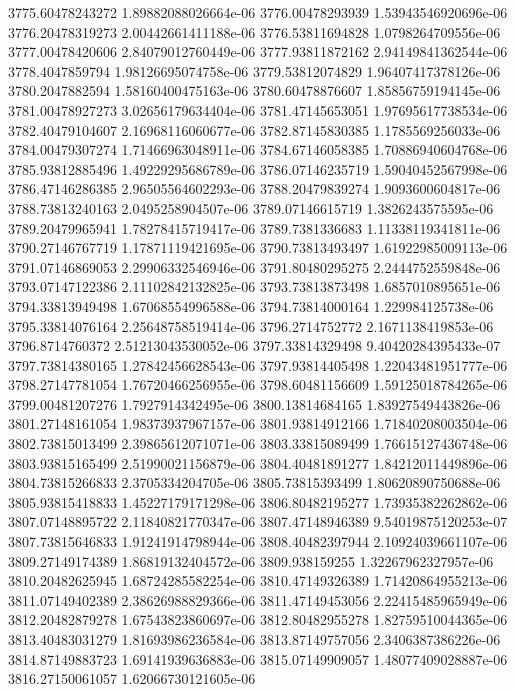 {3775.60478243272 1.89882088026664e-06
3776.00478293939 1.53943546920696e-06
3776.20478319273 2.00442661411188e-06
3776.53811694828 1.0798264709556e-06
3777.00478420606 2.84079012760449e-06
3777.93811872162 2.94149841362544e-06
3778.4047859794 1.98126695074758e-06
3779.53812074829 1.96407417378126e-06
3780.2047882594 1.58160400475163e-06
3780.60478876607 1.85856759194145e-06
3781.00478927273 3.02656179634404e-06
3781.47145653051 1.97695617738534e-06
3782.40479104607 2.16968116060677e-06
3782.87145830385 1.1785569256033e-06
3784.00479307274 1.71466963048911e-06
3784.67146058385 1.70886940604768e-06
3785.93812885496 1.49229295686789e-06
3786.07146235719 1.59040452567998e-06
3786.47146286385 2.96505564602293e-06
3788.20479839274 1.9093600604817e-06
3788.73813240163 2.0495258904507e-06
3789.07146615719 1.3826243575595e-06
3789.20479965941 1.78278415719417e-06
3789.7381336683 1.11338119341811e-06
3790.27146767719 1.17871119421695e-06
3790.73813493497 1.61922985009113e-06
3791.07146869053 2.29906332546946e-06
3791.80480295275 2.2444752559848e-06
3793.07147122386 2.11102842132825e-06
3793.73813873498 1.6857010895651e-06
3794.33813949498 1.67068554996588e-06
3794.73814000164 1.229984125738e-06
3795.33814076164 2.25648758519414e-06
3796.2714752772 2.1671138419853e-06
3796.8714760372 2.51213043530052e-06
3797.33814329498 9.40420284395433e-07
3797.73814380165 1.27842456628543e-06
3797.93814405498 1.22043481951777e-06
3798.27147781054 1.76720466256955e-06
3798.60481156609 1.59125018784265e-06
3799.00481207276 1.7927914342495e-06
3800.13814684165 1.83927549443826e-06
3801.27148161054 1.98373937967157e-06
3801.93814912166 1.71840208003504e-06
3802.73815013499 2.39865612071071e-06
3803.33815089499 1.76615127436748e-06
3803.93815165499 2.51990021156879e-06
3804.40481891277 1.84212011449896e-06
3804.73815266833 2.3705334204705e-06
3805.73815393499 1.80620890750688e-06
3805.93815418833 1.45227179171298e-06
3806.80482195277 1.73935382262862e-06
3807.07148895722 2.11840821770347e-06
3807.47148946389 9.54019875120253e-07
3807.73815646833 1.91241914798944e-06
3808.40482397944 2.10924039661107e-06
3809.27149174389 1.86819132404572e-06
3809.938159255 1.32267962327957e-06
3810.20482625945 1.68724285582254e-06
3810.47149326389 1.71420864955213e-06
3811.07149402389 2.38626988829366e-06
3811.47149453056 2.22415485965949e-06
3812.20482879278 1.67543823860697e-06
3812.80482955278 1.82759510044365e-06
3813.40483031279 1.81693986236584e-06
3813.87149757056 2.3406387386226e-06
3814.87149883723 1.69141939636883e-06
3815.07149909057 1.48077409028887e-06
3816.27150061057 1.62066730121605e-06
}
